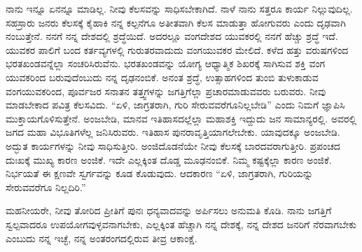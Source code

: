 ನಾನು ಇನ್ನೂ ಏನನ್ನೂ ಮಾಡಿಲ್ಲ. ನೀವು ಕೆಲಸವನ್ನು ಸಾಧಿಸಬೇಕಾಗಿದೆ. ನಾಳೆ ನಾನು ಸತ್ತರೂ ಕಾರ್ಯ ನಿಲ್ಲುವುದಿಲ್ಲ. ಸಹಸ್ರಾರು ಜನರು ಕೆಲಸಕ್ಕೆ ಕೈಹಾಕಿ ನನ್ನ ಕಲ್ಪನೆಗೂ ಅತೀತವಾಗಿ ಕೆಲಸ ಮಾಡುತ್ತಾ ಹೋಗುವರು ಎಂದು ದೃಢವಾಗಿ ನಂಬುತ್ತೇನೆ. ನನಗೆ ನನ್ನ ದೇಶದಲ್ಲಿ ಶ್ರದ್ಧೆಯಿದೆ. ಅದರಲ್ಲೂ ವಂಗದೇಶದ ಯುವಕರಲ್ಲಿ ನನಗೆ ಹೆಚ್ಚು ಶ್ರದ್ಧೆ ಇದೆ. ಯುವಕರ ಪಾಲಿಗೆ ಬಂದ ಕರ್ತವ್ಯಗಳಲ್ಲಿ ಗುರುತರವಾದುದು ವಂಗಯುವಕರ ಮೇಲಿದೆ. ಕಳೆದ ಹತ್ತು ವರುಷಗಳಿಂದ ಭರತಖಂಡವನ್ನೆಲ್ಲಾ ಸಂಚರಿಸಿರುವೆನು. ಭರತಖಂಡವನ್ನು ಯೋಗ್ಯ ಆಧ್ಯಾತ್ಮಿಕ ಶಿಖರಕ್ಕೆ ಸಾಗಿಸುವ ಶಕ್ತಿ ವಂಗ ಯುವಕರಿಂದ ಬರುವುದೆಂಬುದು ನನ್ನ ದೃಢನಂಬಿಕೆ. ಅನಂತ ಶ್ರದ್ಧೆ, ಉತ್ಸಾಹಗಳಿಂದ ತುಂಬಿ ತುಳುಕಾಡುವ ವಂಗಯುವಕರಿಂದ, ಪೂರ್ವಜರ ಸನಾತನ ತತ್ತ್ವಗಳನ್ನು ಜಗತ್ತಿಗೆಲ್ಲಾ ಪ್ರಚಾರಮಾಡುವವರು ಬರುವರು. ನೀವು ಮಾಡಬೇಕಾದ ಪವಿತ್ರ ಕೆಲಸವಿದು. “ಏಳಿ, ಜಾಗ್ರತರಾಗಿ, ಗುರಿ ಸೇರುವವರೆಗೂ\break ನಿಲ್ಲಬೇಡಿ” ಎಂದು ನಿಮಗೆ ಜ್ಞಾಪಿಸಿ ಮುಕ್ತಾಯಗೊಳಿಸುತ್ತೇನೆ. ಅಂಜಬೇಡಿ, ಮಾನವ ಇತಿಹಾಸದಲ್ಲೆಲ್ಲಾ ಮಹಾಶಕ್ತಿ ಇದ್ದುದು ಜನ ಸಾಮಾನ್ಯರಲ್ಲಿ. ಅವರಲ್ಲಿ ಜಗದ ಮಹಾ ವಿಭೂತಿಗಳೆಲ್ಲ ಜನಿಸಿರುವರು. ಇತಿಹಾಸ ಪುನರಾವೃತ್ತಿಯಾಗಲೇಬೇಕು. ಯಾವುದಕ್ಕೂ ಅಂಜಬೇಡಿ. ಅದ್ಭುತ ಕಾರ್ಯಗಳನ್ನು ನೀವು ಸಾಧಿಸುತ್ತೀರಿ. ಅಂಜಿದೊಡನೆಯೇ ನೀವು ಕೆಲಸಕ್ಕೆ ಬಾರದವರಾಗುತ್ತೀರಿ. ಪ್ರಪಂಚದ ದುಃಖಕ್ಕೆ ಮುಖ್ಯ ಕಾರಣ ಅಂಜಿಕೆ. ಇದೇ ಎಲ್ಲಕ್ಕಿಂತ ದೊಡ್ಡ ಮೂಢನಂಬಿಕೆ. ನಿಮ್ಮ ಕಷ್ಟಕ್ಕೆಲ್ಲಾ ಕಾರಣ ಅಂಜಿಕೆ. ನಿರ್ಭಯತೆ ಈ ಕ್ಷಣವೇ ಸ್ವರ್ಗವನ್ನು ಕೂಡ ಕೊಡುವುದು. ಆದಕಾರಣ “ಏಳಿ, ಜಾಗ್ರತರಾಗಿ, ಗುರಿಯನ್ನು ಸೇರುವವರೆಗೂ ನಿಲ್ಲದಿರಿ.”

ಮಹನೀಯರೇ, ನೀವು ತೋರಿದ ಪ್ರೀತಿಗೆ ಪುನಃ ಧನ್ಯವಾದವನ್ನು ಅರ್ಪಿಸಲು ಅನುಮತಿ ಕೊಡಿ. ನಾನು ಜಗತ್ತಿಗೆ ಸ್ವಲ್ಪವಾದರೂ ಉಪಯೋಗವುಳ್ಳವನಾಗಬೇಕು, ಎಲ್ಲಕ್ಕಿಂತ ಹೆಚ್ಚಾಗಿ ನನ್ನ ದೇಶಕ್ಕೆ, ನನ್ನ ದೇಶದ ಜನರಿಗೆ ನೆರವಾಗಬೇಕು ಎಂಬುದು ನನ್ನ ಇಚ್ಛೆ, ನನ್ನ ಅಂತರಂಗದಲ್ಲಿರುವ ತೀವ್ರ ಆಕಾಂಕ್ಷೆ.

